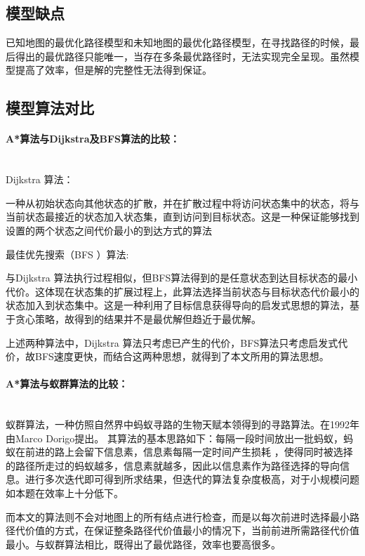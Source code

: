 \documentclass[withoutpreface,bwprint]{cumcmthesis} %
\begin{document}
\subsection{模型缺点}
已知地图的最优化路径模型和未知地图的最优化路径模型，在寻找路径的时候，最后得出的最优路径只能唯一，当存在多条最优路径时，无法实现完全呈现。虽然模型提高了效率，但是解的完整性无法得到保证。

\subsection{模型算法对比}

\paragraph{A*算法与Dijkstra及BFS算法的比较：}~{}
\\

Dijkstra 算法：

一种从初始状态向其他状态的扩散，并在扩散过程中将访问状态集中的状态，将与当前状态最接近的状态加入状态集，直到访问到目标状态。这是一种保证能够找到设置的两个状态之间代价最小的到达方式的算法

最佳优先搜索（BFS ）算法:

与Dijkstra 算法执行过程相似，但BFS算法得到的是任意状态到达目标状态的最小代价。这体现在状态集的扩展过程上，此算法选择当前状态与目标状态代价最小的状态加入到状态集中。这是一种利用了目标信息获得导向的启发式思想的算法，基于贪心策略，故得到的结果并不是最优解但趋近于最优解。

上述两种算法中，Dijkstra 算法只考虑已产生的代价，BFS算法只考虑启发式代价，故BFS速度更快，而结合这两种思想，就得到了本文所用的算法思想。

\paragraph{A*算法与蚁群算法的比较：}~{}
\\

蚁群算法，一种仿照自然界中蚂蚁寻路的生物天赋本领得到的寻路算法。在1992年由Marco Dorigo提出。
其算法的基本思路如下：每隔一段时间放出一批蚂蚁，蚂蚁在前进的路上会留下信息素，信息素每隔一定时间产生损耗
，使得同时被选择的路径所走过的蚂蚁越多，信息素就越多，因此以信息素作为路径选择的导向信息。进行多次迭代即可得到所求结果，但迭代的算法复杂度极高，对于小规模问题如本题在效率上十分低下。

而本文的算法则不会对地图上的所有结点进行检查，而是以每次前进时选择最小路径代价值的方式，在保证整条路径代价值最小的情况下，当前前进所需路径代价值最小。与蚁群算法相比，既得出了最优路径，效率也要高很多。
\end{document}
